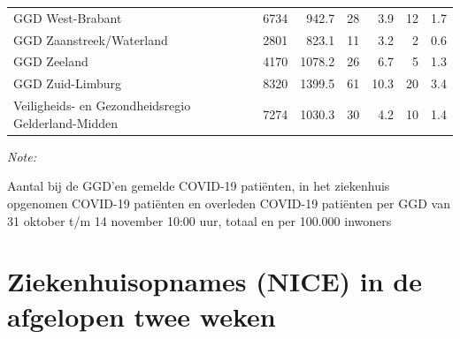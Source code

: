 \documentclass[
  english,
  man,floatsintext]{apa6}
\begin{document}
\begin{table}
\begin{threeparttable}
\begin{tabular}{lrrrrrr}
GGD West-Brabant & 6734 & 942.7 & 28 & 3.9 & 12 & 1.7\\
GGD Zaanstreek/Waterland & 2801 & 823.1 & 11 & 3.2 & 2 & 0.6\\
GGD Zeeland & 4170 & 1078.2 & 26 & 6.7 & 5 & 1.3\\
GGD Zuid-Limburg & 8320 & 1399.5 & 61 & 10.3 & 20 & 3.4\\
Veiligheids- en Gezondheidsregio Gelderland-Midden & 7274 & 1030.3 & 30 & 4.2 & 10 & 1.4\\
\bottomrule
\end{tabular}
\begin{tablenotes}
\item \textit{Note: } 
\item Aantal bij de GGD’en gemelde COVID-19 patiënten, in het ziekenhuis opgenomen COVID-19 patiënten en overleden COVID-19 patiënten per GGD van 31 oktober t/m 14 november 10:00 uur, totaal en per 100.000 inwoners
\end{tablenotes}
\end{threeparttable}
\endgroup{}
\end{table}

\newpage

\hypertarget{ziekenhuisopnames-nice-in-de-afgelopen-twee-weken}{%
\section{Ziekenhuisopnames (NICE) in de afgelopen twee weken}\label{ziekenhuisopnames-nice-in-de-afgelopen-twee-weken}}
\end{document}

